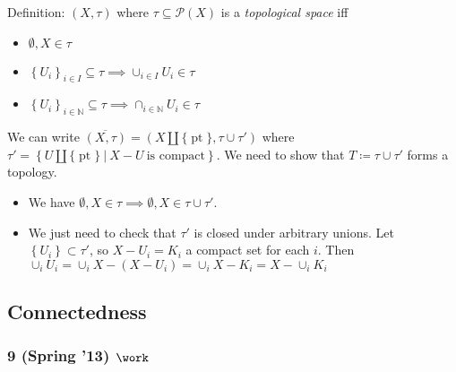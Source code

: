\begin{solution}

\hfill

\begin{concept}

\hfill

Definition: \((X, \tau)\) where \(\tau \subseteq \mathcal P(X)\) is a
\emph{topological space} iff

\begin{itemize}
\tightlist
\item
  \(\emptyset, X \in \tau\)
\item
  \(\left\{{U_i}\right\}_{i\in I} \subseteq \tau \implies \cup_{i\in I} U_i \in \tau\)
\item
  \(\left\{{U_i}\right\}_{i\in {\mathbb{N}}} \subseteq \tau \implies \cap_{i\in {\mathbb{N}}} U_i \in \tau\)
\end{itemize}

\end{concept}

We can write
\(\overline{(X, \tau)} = (X {\coprod}{\{\operatorname{pt}\}}, \tau \cup\tau')\)
where
\(\tau' = \left\{{U{\coprod}{\{\operatorname{pt}\}}{~\mathrel{\Big|}~}X-U ~\text{is compact}}\right\}\).
We need to show that \(T \coloneqq\tau \cup\tau'\) forms a topology.

\begin{itemize}
\tightlist
\item
  We have
  \(\emptyset,X \in \tau \implies \emptyset, X \in \tau \cup\tau'\).
\item
  We just need to check that \(\tau'\) is closed under arbitrary unions.
  Let \(\left\{{U_i}\right\} \subset \tau'\), so \(X-U_i = K_i\) a
  compact set for each \(i\). Then
  \(\cup_{i} U_i = \cup_i X- (X-U_i)= \cup_i X - K_i = X - \cup_i K_i\)
\end{itemize}

\end{solution}

\hypertarget{connectedness}{%
\subsection{Connectedness}\label{connectedness}}

\hypertarget{spring-13-work}{%
\subsubsection{\texorpdfstring{9 (Spring '13)
\(\work\)}{9 (Spring '13) \textbackslash work}}\label{spring-13-work}}

